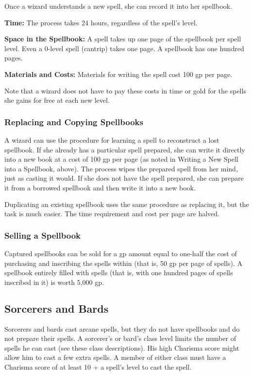 Once a wizard understands a new spell, she can record it into her spellbook.

\textbf{Time:} The process takes 24 hours, regardless of the spell's level.

\textbf{Space in the Spellbook:} A spell takes up one page of the spellbook per 
spell level. Even a 0-level spell (cantrip) takes one page. A spellbook has one 
hundred pages.

\textbf{Materials and Costs:} Materials for writing the spell cost 100 gp per page.

Note that a wizard does not have to pay these costs in time or gold for the spells 
she gains for free at each new level. 

\subsubsection{Replacing and Copying Spellbooks}

A wizard can use the procedure for learning a spell to reconstruct a lost spellbook. 
If she already has a particular spell prepared, she can write it directly into 
a new book at a cost of 100 gp per page (as noted in Writing a New Spell into a 
Spellbook, above). The process wipes the prepared spell from her mind, just as 
casting it would. If she does not have the spell prepared, she can prepare it from 
a borrowed spellbook and then write it into a new book.

Duplicating an existing spellbook uses the same procedure as replacing it, but 
the task is much easier. The time requirement and cost per page are halved.

\subsubsection{Selling a Spellbook}

Captured spellbooks can be sold for a gp amount equal to one-half the cost of purchasing 
and inscribing the spells within (that is, 50 gp per page of spells). 
A spellbook entirely filled with spells (that is, with one hundred pages of spells 
inscribed in it) is worth 5,000 gp.

\subsection{Sorcerers and Bards}

Sorcerers and bards cast arcane spells, but they do not have spellbooks and do 
not prepare their spells. A sorcerer's or bard's class level limits the number 
of spells he can cast (see these class descriptions). His high Charisma score might 
allow him to cast a few extra spells. A member of either class must have a Charisma 
score of at least 10 + a spell's level to cast the spell.

